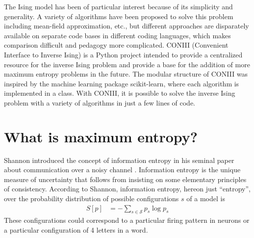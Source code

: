 \documentclass[aps,prl,twocolumn]{revtex4-1}
\begin{document}
The Ising model has been of particular interest because of its simplicity and generality. A variety of algorithms have been proposed to solve this problem including mean-field approximation, etc., but different approaches are disparately available on separate code bases in different coding languages, which makes comparison difficult and pedagogy more complicated.
CONIII (Convenient Interface to Inverse Ising) is a Python project intended to provide a centralized resource for the inverse Ising problem and provide a base for the addition of more maximum entropy problems in the future. 
The modular structure of CONIII was inspired by the machine learning package scikit-learn, where each algorithm is implemented in a class.
With CONIII, it is possible to solve the inverse Ising problem with a variety of algorithms in just a few lines of code.


\section{What is maximum entropy?}
Shannon introduced the concept of information entropy in his seminal paper about communication over a noisy channel \cite{Shannon:1948wk}. Information entropy is the unique measure of uncertainty that follows from insisting on some elementary principles of consistency. According to Shannon, information entropy, hereon just ``entropy'', over the probability distribution of possible configurations $s$ of a model is
\begin{align}
	S[p] &= -\sum_{s\in \mathcal{S}} p_s \log p_s
\end{align}
These configurations could correspond to a particular firing pattern in neurons or a particular configuration of 4 letters in a word.
\end{document}
